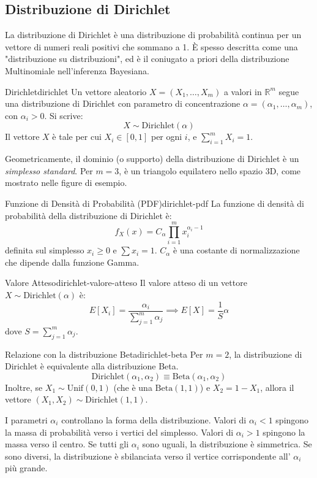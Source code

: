 \subsection{Distribuzione di Dirichlet}

La distribuzione di Dirichlet è una distribuzione di probabilità continua per
un vettore di numeri reali positivi che sommano a 1. È spesso descritta come
una "distribuzione su distribuzioni", ed è il coniugato a priori della
distribuzione Multinomiale nell'inferenza Bayesiana.

\begin{definizione}{Dirichlet}{dirichlet}
Un vettore aleatorio $X = (X_1, \dots, X_m)$ a valori in $\mathbb{R}^m$ segue
una distribuzione di Dirichlet con parametro di concentrazione $\alpha =
(\alpha_1, \dots, \alpha_m)$, con $\alpha_i > 0$. Si scrive:
$$
X \sim \text{Dirichlet}(\alpha)
$$
Il vettore $X$ è tale per cui $X_i \in [0, 1]$ per ogni $i$, e $\sum_{i=1}^{m}
X_i = 1$.
\end{definizione}

Geometricamente, il dominio (o supporto) della distribuzione di Dirichlet è un
\textit{simplesso standard}. Per $m=3$, è un triangolo equilatero nello spazio
3D, come mostrato nelle figure di esempio.

\begin{proposizione}{Funzione di Densità di Probabilità (PDF)}{dirichlet-pdf}
La funzione di densità di probabilità della distribuzione di Dirichlet è:
$$
f_X(x) = C_\alpha \prod_{i=1}^{m} x_i^{\alpha_i - 1}
$$
definita sul simplesso $x_i \ge 0$ e $\sum x_i = 1$. $C_\alpha$ è una costante
di normalizzazione che dipende dalla funzione Gamma.
\end{proposizione}

\begin{proposizione}{Valore Atteso}{dirichlet-valore-atteso}
Il valore atteso di un vettore $X \sim \text{Dirichlet}(\alpha)$ è:
$$
E[X_i] = \frac{\alpha_i}{\sum_{j=1}^{m} \alpha_j} \implies E[X] = \frac{1}{S}
\alpha
$$
dove $S = \sum_{j=1}^{m} \alpha_j$.
\end{proposizione}

\begin{nota}{Relazione con la distribuzione Beta}{dirichlet-beta}
Per $m=2$, la distribuzione di Dirichlet è equivalente alla distribuzione Beta.
$$
\text{Dirichlet}(\alpha_1, \alpha_2) \equiv \text{Beta}(\alpha_1, \alpha_2)
$$
Inoltre, se $X_1 \sim \text{Unif}(0,1)$ (che è una $\text{Beta}(1,1)$) e $X_2 =
1 - X_1$, allora il vettore $(X_1, X_2) \sim \text{Dirichlet}(1, 1)$.
\end{nota}

I parametri $\alpha_i$ controllano la forma della distribuzione. Valori di
$\alpha_i < 1$ spingono la massa di probabilità verso i vertici del simplesso.
Valori di $\alpha_i > 1$ spingono la massa verso il centro. Se tutti gli
$\alpha_i$ sono uguali, la distribuzione è simmetrica. Se sono diversi, la
distribuzione è sbilanciata verso il vertice corrispondente all' $\alpha_i$
più grande.
